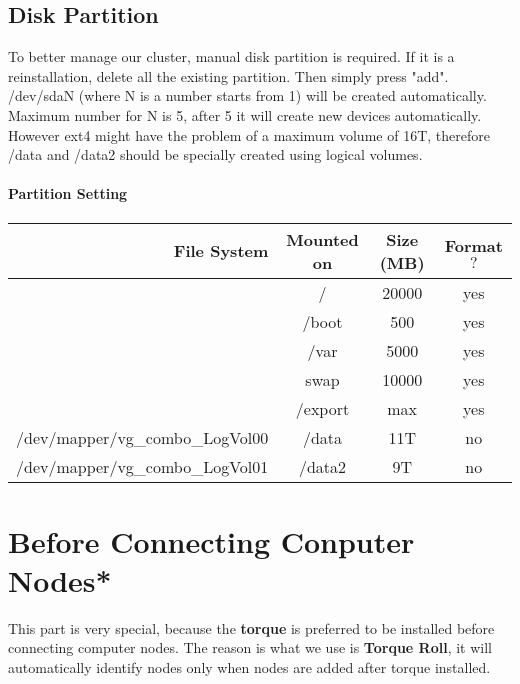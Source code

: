 \subsection{Disk Partition}
To better manage our cluster, manual disk partition is required. If it is a reinstallation, delete all the existing partition. Then simply press "add". /dev/sdaN (where N is a number starts from 1) will be created automatically. Maximum number for N is 5, after 5 it will create new devices automatically. However ext4 might have the problem of a maximum volume of 16T, therefore /data and /data2 should be specially created using logical volumes. 
\paragraph{Partition Setting}
\begin{tabular}{ | r | c | c | c |}
	\hline
		File System & Mounted on & Size (MB) & Format $?$ \\ \hline
		 & / & 20000 & yes \\ \hline
		 & /boot & 500 & yes \\ \hline
		 & /var & 5000 & yes \\ \hline
		 & swap & 10000 & yes \\ \hline
		 & /export & max & yes \\ \hline
		/dev/mapper/vg\_combo\_LogVol00 & /data & 11T & no \\ \hline
		/dev/mapper/vg\_combo\_LogVol01 & /data2 & 9T & no \\
	\hline
\end{tabular}

\section{Before Connecting Conputer Nodes*}
This part is very special, because the {\bf torque} is preferred to be installed before connecting computer nodes. The reason is what we use is {\bf Torque Roll}, it will automatically identify nodes only when nodes are added after torque installed. 


